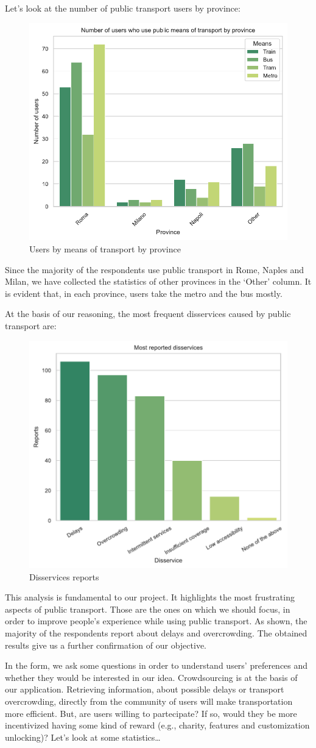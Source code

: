 \documentclass[a4paper, 11pt]{report}
\begin{document}
Let's look at the number of public transport users by province:
\begin{figure}[H]
	\centering
	\includegraphics[width=.5\textwidth]{img/analysis/users_by_means_of_transport_by_province.pdf}
	\caption{Users by means of transport by province}
\end{figure}
Since the majority of the respondents use public transport in Rome, Naples and Milan, we have collected the statistics of other provinces in the `Other' column.
It is evident that, in each province, users take the metro and the bus mostly.

At the basis of our reasoning, the most frequent disservices caused by public transport are:
\begin{figure}[H]
	\centering
	\includegraphics[width=.5\textwidth]{img/analysis/disservices_reports.pdf}
	\caption{Disservices reports}
\end{figure}
This analysis is fundamental to our project. It highlights the most frustrating aspects of public transport.
Those are the ones on which we should focus, in order to improve people's experience while using public transport.
As shown, the majority of the respondents report about delays and overcrowding. The obtained results give us a further confirmation of our objective.


In the form, we ask some questions in order to understand users' preferences and whether they would be interested
in our idea.
Crowdsourcing is at the basis of our application. Retrieving information, about possible delays or
transport overcrowding, directly from the community of users will make transportation more efficient.
But, are users willing to partecipate? If so, would they be more incentivized having some kind of reward (e.g., charity, features and customization unlocking)?
Let's look at some statistics\dots
\end{document}
